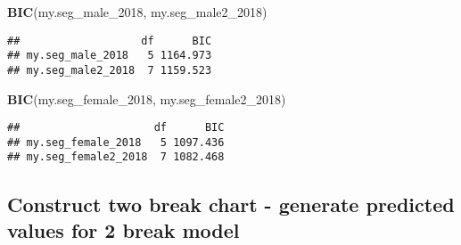 \documentclass[]{article}
\newenvironment{Shaded}{\begin{snugshade}}{\end{snugshade}}
\newcommand{\KeywordTok}[1]{\textcolor[rgb]{0.13,0.29,0.53}{\textbf{#1}}}
\newcommand{\DataTypeTok}[1]{\textcolor[rgb]{0.13,0.29,0.53}{#1}}
\newcommand{\DecValTok}[1]{\textcolor[rgb]{0.00,0.00,0.81}{#1}}
\newcommand{\StringTok}[1]{\textcolor[rgb]{0.31,0.60,0.02}{#1}}
\newcommand{\OperatorTok}[1]{\textcolor[rgb]{0.81,0.36,0.00}{\textbf{#1}}}
\newcommand{\NormalTok}[1]{#1}
\begin{document}
\begin{Shaded}
\begin{Highlighting}[]
\KeywordTok{BIC}\NormalTok{(my.seg_male_}\DecValTok{2018}\NormalTok{, my.seg_male2_}\DecValTok{2018}\NormalTok{)}
\end{Highlighting}
\end{Shaded}

\begin{verbatim}
##                   df      BIC
## my.seg_male_2018   5 1164.973
## my.seg_male2_2018  7 1159.523
\end{verbatim}

\begin{Shaded}
\begin{Highlighting}[]
\KeywordTok{BIC}\NormalTok{(my.seg_female_}\DecValTok{2018}\NormalTok{, my.seg_female2_}\DecValTok{2018}\NormalTok{)}
\end{Highlighting}
\end{Shaded}

\begin{verbatim}
##                     df      BIC
## my.seg_female_2018   5 1097.436
## my.seg_female2_2018  7 1082.468
\end{verbatim}

\subsection{Construct two break chart - generate predicted values for 2
break
model}\label{construct-two-break-chart---generate-predicted-values-for-2-break-model}

\begin{Shaded}
\end{Shaded}
\end{document}
